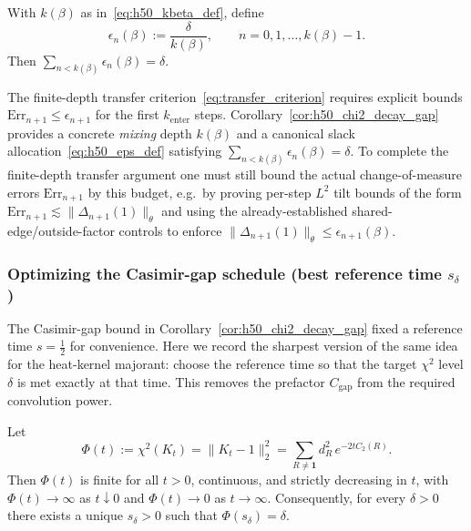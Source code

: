 \begin{definition}\label{def:h50_eps_budget}
With $k(\beta)$ as in~\eqref{eq:h50_kbeta_def}, define
\begin{equation}\label{eq:h50_eps_def}
\epsilon_n(\beta):=\frac{\delta}{k(\beta)},\qquad n=0,1,\dots,k(\beta)-1.
\end{equation}
Then $\sum_{n<k(\beta)}\epsilon_n(\beta)=\delta$.
\end{definition}

\begin{remark}
The finite-depth transfer criterion~\eqref{eq:transfer_criterion} requires explicit bounds
$\mathrm{Err}_{n+1}\le \epsilon_{n+1}$ for the first $k_{\mathrm{enter}}$ steps.
Corollary~\ref{cor:h50_chi2_decay_gap} provides a concrete \emph{mixing} depth $k(\beta)$ and a canonical slack allocation~\eqref{eq:h50_eps_def}
satisfying $\sum_{n<k(\beta)}\epsilon_n(\beta)=\delta$.
To complete the finite-depth transfer argument one must still bound the actual change-of-measure errors
$\mathrm{Err}_{n+1}$ by this budget, e.g.\ by proving per-step $L^2$ tilt bounds
of the form $\mathrm{Err}_{n+1}\lesssim \|\Delta_{n+1}(1)\|_\theta$
and using the already-established shared-edge/outside-factor controls to enforce
$\|\Delta_{n+1}(1)\|_\theta \le \epsilon_{n+1}(\beta)$.
\end{remark}



\subsubsection{Optimizing the Casimir-gap schedule (best reference time \texorpdfstring{$s_\delta$}{s\_delta})}\label{subsec:hardened51_optimal_time}

The Casimir-gap bound in Corollary~\ref{cor:h50_chi2_decay_gap} fixed a reference time $s=\tfrac12$ for convenience.
Here we record the sharpest version of the same idea for the heat-kernel majorant:
choose the reference time so that the target $\chi^2$ level $\delta$ is met exactly at that time.
This removes the prefactor $C_{\mathrm{gap}}$ from the required convolution power.

\begin{lemma}\label{lem:h51_chi2_monotone}
Let
\[
\Phi(t):=\chi^2(K_t)=\|K_t-1\|_2^2=\sum_{R\ne \mathbf 1} d_R^2\,e^{-2tC_2(R)}.
\]
Then $\Phi(t)$ is finite for all $t>0$, continuous, and strictly decreasing in $t$, with
$\Phi(t)\to\infty$ as $t\downarrow 0$ and $\Phi(t)\to 0$ as $t\to\infty$.
Consequently, for every $\delta>0$ there exists a unique $s_\delta>0$ such that $\Phi(s_\delta)=\delta$.
\end{lemma}

